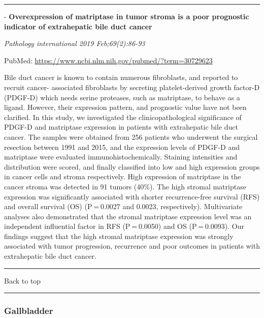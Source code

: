 \documentclass[]{article}
\begin{document}
\begin{center}\rule{0.5\linewidth}{\linethickness}\end{center}

 - \textbf{Overexpression of matriptase in tumor stroma is a poor
prognostic indicator of extrahepatic bile duct cancer}

\emph{Pathology international 2019 Feb;69(2):86-93}

PubMed: \url{https://www.ncbi.nlm.nih.gov/pubmed/?term=30729623}

Bile duct cancer is known to contain numerous fibroblasts, and reported
to recruit cancer- associated fibroblasts by secreting platelet-derived
growth factor-D (PDGF-D) which needs serine proteases, such as
matriptase, to behave as a ligand. However, their expression pattern,
and prognostic value have not been clarified. In this study, we
investigated the clinicopathological significance of PDGF-D and
matriptase expression in patients with extrahepatic bile duct cancer.
The samples were obtained from 256 patients who underwent the surgical
resection between 1991 and 2015, and the expression levels of PDGF-D and
matriptase were evaluated immunohistochemically. Staining intensities
and distribution were scored, and finally classified into low and high
expression groups in cancer cells and stroma respectively. High
expression of matriptase in the cancer stroma was detected in 91 tumors
(40\%). The high stromal matriptase expression was significantly
associated with shorter recurrence-free survival (RFS) and overall
survival (OS) (P = 0.0027 and 0.0023, respectively). Multivariate
analyses also demonstrated that the stromal matriptase expression level
was an independent influential factor in RFS (P = 0.0050) and OS
(P = 0.0093). Our findings suggest that the high stromal matriptase
expression was strongly associated with tumor progression, recurrence
and poor outcomes in patients with extrahepatic bile duct cancer.

{}

{}

\begin{center}\rule{0.5\linewidth}{\linethickness}\end{center}

Back to top

\begin{center}\rule{0.5\linewidth}{\linethickness}\end{center}

\pagebreak

\hypertarget{gallbladder}{%
\subsubsection{Gallbladder}\label{gallbladder}}
\end{document}
